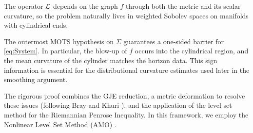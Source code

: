 The operator $\mathcal{L}$ depends on the graph $f$ through both the metric and its scalar curvature, so the problem naturally lives in weighted Sobolev spaces on manifolds with cylindrical ends.

\begin{remark}
The outermost MOTS hypothesis on $\Sigma$ guarantees a one-sided barrier for \eqref{eq:System}. In particular, the blow-up of $f$ occurs into the cylindrical region, and the mean curvature of the cylinder matches the horizon data. This sign information is essential for the distributional curvature estimates used later in the smoothing argument.
\end{remark}

The rigorous proof combines the GJE reduction, a metric deformation to resolve these issues (following Bray and Khuri \cite{braykhuri2010}), and the application of the level set method for the Riemannian Penrose Inequality. In this framework, we employ the Nonlinear Level Set Method (AMO) \cite{amo2024}.

